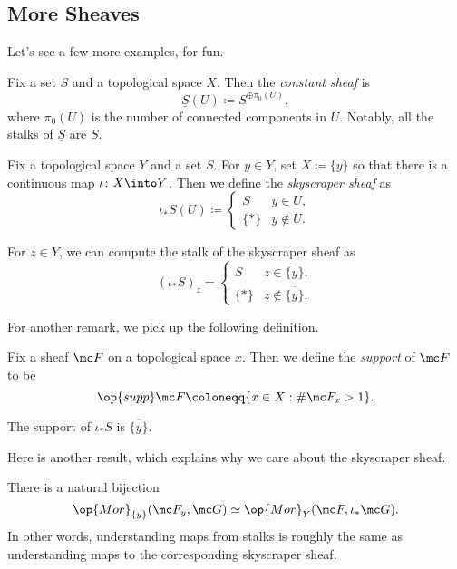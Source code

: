 \documentclass[../notes.tex]{subfiles}
\begin{document}
\subsection{More Sheaves}
Let's see a few more examples, for fun.
\begin{definition}
	Fix a set $S$ and a topological space $X$. Then the \textit{constant sheaf} is
	\[\underline S(U)\coloneqq S^{\oplus\pi_0(U)},\]
	where $\pi_0(U)$ is the number of connected components in $U$. Notably, all the stalks of $\underline S$ are $S$.
\end{definition}
\begin{definition}
	Fix a topological space $Y$ and a set $S$. For $y\in Y$, set $X\coloneqq\{y\}$ so that there is a continuous map $\iota\colon X\into Y$. Then we define the \textit{skyscraper sheaf} as
	\[\iota_*S(U)\coloneqq\begin{cases}
		S & y\in U, \\
		\{*\} & y\notin U.
	\end{cases}\]
\end{definition}
\begin{remark}
	For $z\in Y$, we can compute the stalk of the skyscraper sheaf as
	\[(\iota_*S)_z=\begin{cases}
		S & z\in\overline{\{y\}}, \\
		\{*\} & z\notin\overline{\{y\}}.
	\end{cases}\]
\end{remark}
For another remark, we pick up the following definition.
\begin{definition}[Support]
	Fix a sheaf $\mc F$ on a topological space $x$. Then we define the \textit{support} of $\mc F$ to be
	\[\op{supp}\mc F\coloneqq\{x\in X:\#\mc F_x>1\}.\]
\end{definition}
\begin{remark}
	The support of $\iota_*S$ is $\overline{\{y\}}$.
\end{remark}
Here is another result, which explains why we care about the skyscraper sheaf.
\begin{proposition}
	There is a natural bijection
	\[\op{Mor}_{\{y\}}(\mc F_y,\mc G)\simeq\op{Mor}_Y(\mc F,\iota_*\mc G).\]
	In other words, understanding maps from stalks is roughly the same as understanding maps to the corresponding skyscraper sheaf.
\end{proposition}
\end{document}
